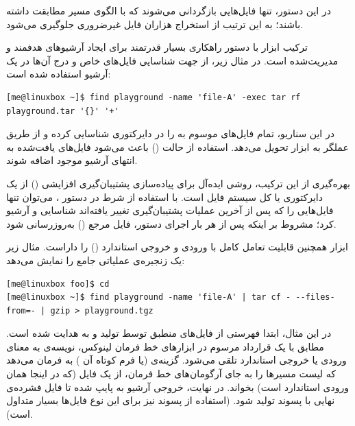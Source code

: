 در این دستور، تنها فایل‌هایی بازگردانی می‌شوند که با الگوی مسیر  مطابقت داشته باشند؛ به این ترتیب از استخراج هزاران فایل غیرضروری جلوگیری می‌شود.

ترکیب ابزار  با دستور  راهکاری بسیار قدرتمند برای ایجاد آرشیوهای هدفمند و مدیریت‌شده است. در مثال زیر، از  جهت شناسایی فایل‌های خاص و درج آن‌ها در یک آرشیو استفاده شده است:

\begin{latin}
\begin{lstlisting}
[me@linuxbox ~]$ find playground -name 'file-A' -exec tar rf playground.tar '{}' '+'
\end{lstlisting}
\end{latin}

در این سناریو،  تمام فایل‌های موسوم به  را در دایرکتوری  شناسایی کرده و از طریق عملگر  به ابزار  تحویل می‌دهد. استفاده از حالت  () باعث می‌شود فایل‌های یافت‌شده به انتهای آرشیو موجود اضافه شوند.

بهره‌گیری از این ترکیب، روشی ایده‌آل برای پیاده‌سازی پشتیبان‌گیری افزایشی () از یک دایرکتوری یا کل سیستم فایل است. با استفاده از شرط  در دستور ، می‌توان تنها فایل‌هایی را که پس از آخرین عملیات پشتیبان‌گیری تغییر یافته‌اند شناسایی و آرشیو کرد؛ مشروط بر اینکه پس از هر بار اجرای دستور، فایل مرجع () به‌روزرسانی شود.

ابزار  همچنین قابلیت تعامل کامل با ورودی و خروجی استاندارد () را داراست. مثال زیر یک زنجیره‌ی عملیاتی جامع را نمایش می‌دهد:

\begin{latin}
\begin{lstlisting}
[me@linuxbox foo]$ cd
[me@linuxbox ~]$ find playground -name 'file-A' | tar cf - --files-from=- | gzip > playground.tgz
\end{lstlisting}
\end{latin}

در این مثال، ابتدا فهرستی از فایل‌های منطبق توسط  تولید و به  هدایت شده است. مطابق با یک قرارداد مرسوم در ابزارهای خط فرمان لینوکس، نویسه‌ی \cmd{-} به معنای ورودی یا خروجی استاندارد تلقی می‌شود. گزینه‌ی  (یا فرم کوتاه آن ) به  فرمان می‌دهد که لیست مسیرها را به جای آرگومان‌های خط فرمان، از یک فایل (که در اینجا همان ورودی استاندارد است) بخواند. در نهایت، خروجی آرشیو به  پایپ شده تا فایل فشرده‌ی نهایی با پسوند  تولید شود. (استفاده از پسوند  نیز برای این نوع فایل‌ها بسیار متداول است).

